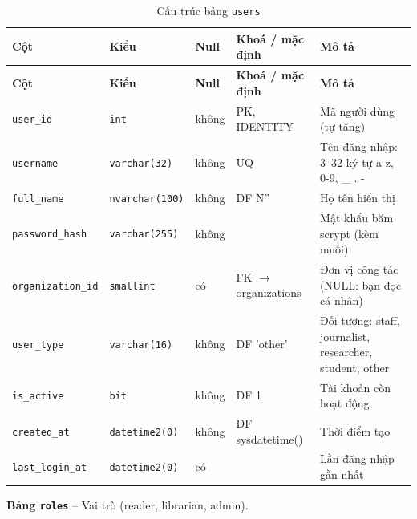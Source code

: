 \setlength{\tabcolsep}{4pt}
\begin{longtable}{>{\raggedright\arraybackslash}p{}>{\raggedright\arraybackslash}p{}>{\centering\arraybackslash}p{}>{\raggedright\arraybackslash}p{}>{\raggedright\arraybackslash}p{}}
\caption{Cấu trúc bảng \texttt{users}}\label{tab:col_users}\\
\toprule \textbf{Cột} & \textbf{Kiểu} & \textbf{Null} & \textbf{Khoá / mặc định} & \textbf{Mô tả} \\ \midrule \endfirsthead
\toprule \textbf{Cột} & \textbf{Kiểu} & \textbf{Null} & \textbf{Khoá / mặc định} & \textbf{Mô tả} \\ \midrule \endhead
\bottomrule \endfoot
\texttt{user\_id} & {\footnotesize\texttt{int}} & không & PK, IDENTITY & Mã người dùng (tự tăng) \\
\texttt{username} & {\footnotesize\texttt{varchar(32)}} & không & UQ & Tên đăng nhập: 3--32 ký tự a-z, 0-9, \_ . - \\
\texttt{full\_name} & {\footnotesize\texttt{nvarchar(100)}} & không & DF N'' & Họ tên hiển thị \\
\texttt{password\_hash} & {\footnotesize\texttt{varchar(255)}} & không &  & Mật khẩu băm scrypt (kèm muối) \\
\texttt{organization\_id} & {\footnotesize\texttt{smallint}} & có & FK $\rightarrow$ organizations & Đơn vị công tác (NULL: bạn đọc cá nhân) \\
\texttt{user\_type} & {\footnotesize\texttt{varchar(16)}} & không & DF 'other' & Đối tượng: staff, journalist, researcher, student, other \\
\texttt{is\_active} & {\footnotesize\texttt{bit}} & không & DF 1 & Tài khoản còn hoạt động \\
\texttt{created\_at} & {\footnotesize\texttt{datetime2(0)}} & không & DF sysdatetime() & Thời điểm tạo \\
\texttt{last\_login\_at} & {\footnotesize\texttt{datetime2(0)}} & có &  & Lần đăng nhập gần nhất \\
\end{longtable}

\textbf{Bảng \texttt{roles}} -- Vai trò (reader, librarian, admin).

